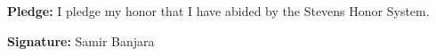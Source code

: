 
    \maketitle

\noindent
\textbf{Pledge:} I pledge my honor that I have abided by the Stevens Honor System.

\noindent
\textbf{Signature:} Samir Banjara



